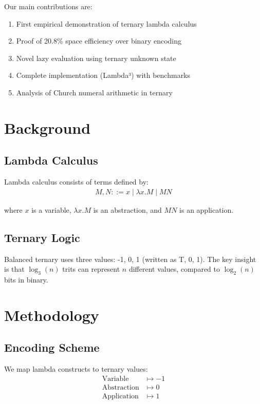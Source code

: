 \documentclass[11pt]{article}
\begin{document}
Our main contributions are:
\begin{enumerate}
    \item First empirical demonstration of ternary lambda calculus
    \item Proof of 20.8\% space efficiency over binary encoding
    \item Novel lazy evaluation using ternary unknown state
    \item Complete implementation (Lambda³) with benchmarks
    \item Analysis of Church numeral arithmetic in ternary
\end{enumerate}

\section{Background}

\subsection{Lambda Calculus}

Lambda calculus consists of terms defined by:
\begin{align}
M, N ::= x \mid \lambda x.M \mid M N
\end{align}

where $x$ is a variable, $\lambda x.M$ is an abstraction, and $M N$ is an application.

\subsection{Ternary Logic}

Balanced ternary uses three values: -1, 0, 1 (written as T, 0, 1). The key insight is that $\log_3(n)$ trits can represent $n$ different values, compared to $\log_2(n)$ bits in binary.

\section{Methodology}

\subsection{Encoding Scheme}

We map lambda constructs to ternary values:
\begin{align}
\text{Variable} &\mapsto -1 \\
\text{Abstraction} &\mapsto 0 \\
\text{Application} &\mapsto 1
\end{align}
\end{document}
